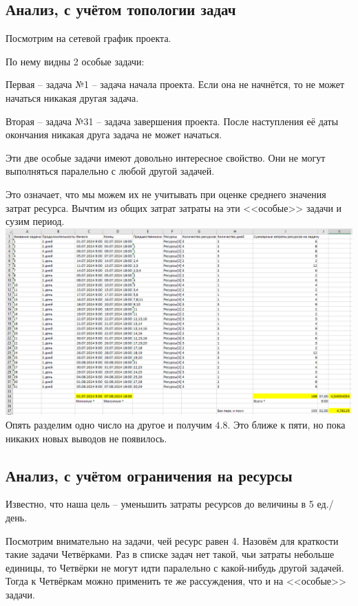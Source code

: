 \documentclass[14pt]{article}
\begin{document}
	\subsection{Анализ, с учётом топологии задач}
		Посмотрим на сетевой график проекта.
		
		По нему видны 2 особые задачи:
		
		Первая -- задача №1 -- задача начала проекта.
		Если она не начнётся, то не может начаться никакая другая задача.
		
		Вторая -- задача №31 -- задача завершения проекта.
		После наступления её даты окончания никакая друга задача не может начаться.
		
		Эти две особые задачи имеют довольно интересное свойство.
		Они не могут выполняться паралельно с любой другой задачей.
		
		Это означает, что мы можем их не учитывать при оценке среднего значения затрат ресурса.
		Вычтим из общих затрат затраты на эти <<особые>> задачи и сузим период.\\
		\includegraphics[width=\textwidth]{../img/1a2_time_estimation.png}\\ 
		Опять разделим одно число на другое и получим $4.8$.
		Это ближе к пяти, но пока никаких новых выводов не появилось.
	\subsection{Анализ, с учётом ограничения на ресурсы}
		Известно, что наша цель -- уменьшить затраты ресурсов до величины в 5 ед./день.
		
		Посмотрим внимательно на задачи, чей ресурс равен 4.
		Назовём для краткости такие задачи Четвёрками.
		Раз в списке задач нет такой, чьи затраты небольше единицы, то Четвёрки не могут идти паралельно с какой-нибудь другой задачей.
		Тогда к Четвёркам можно применить те же рассуждения, что и на <<особые>> задачи.
		
\end{document}
